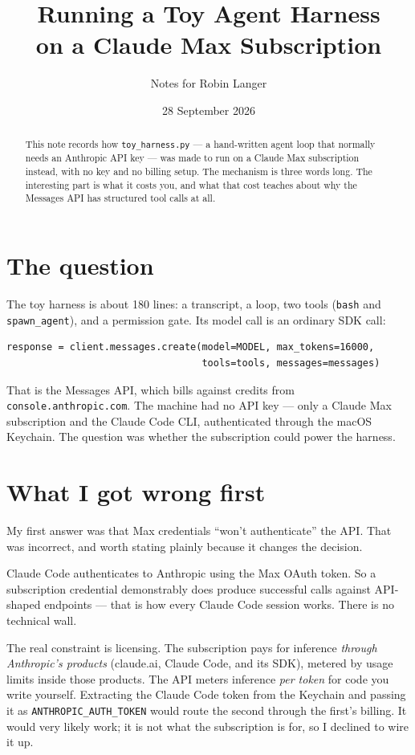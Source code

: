 \documentclass[11pt,a4paper]{article}
\title{\textbf{Running a Toy Agent Harness\\on a Claude Max Subscription}}
\author{Notes for Robin Langer}
\date{28 September 2026}
\newcommand{\code}[1]{\texttt{#1}}
\begin{document}
\maketitle

\begin{abstract}
\noindent
This note records how \code{toy\_harness.py} --- a hand-written agent loop that
normally needs an Anthropic API key --- was made to run on a Claude Max
subscription instead, with no key and no billing setup. The mechanism is three
words long. The interesting part is what it costs you, and what that cost
teaches about why the Messages API has structured tool calls at all.
\end{abstract}

\section{The question}

The toy harness is about 180 lines: a transcript, a loop, two tools
(\code{bash} and \code{spawn\_agent}), and a permission gate. Its model call is
an ordinary SDK call:

\begin{lstlisting}[style=py]
response = client.messages.create(model=MODEL, max_tokens=16000,
                                  tools=tools, messages=messages)
\end{lstlisting}

That is the Messages API, which bills against credits from
\code{console.anthropic.com}. The machine had no API key --- only a Claude Max
subscription and the Claude Code CLI, authenticated through the macOS Keychain.
The question was whether the subscription could power the harness.

\section{What I got wrong first}

My first answer was that Max credentials ``won't authenticate'' the API. That
was incorrect, and worth stating plainly because it changes the decision.

Claude Code authenticates to Anthropic using the Max OAuth token. So a
subscription credential demonstrably does produce successful calls against
API-shaped endpoints --- that is how every Claude Code session works. There is
no technical wall.

The real constraint is licensing. The subscription pays for inference
\emph{through Anthropic's products} (claude.ai, Claude Code, and its SDK),
metered by usage limits inside those products. The API meters inference
\emph{per token} for code you write yourself. Extracting the Claude Code token
from the Keychain and passing it as \code{ANTHROPIC\_AUTH\_TOKEN} would route
the second through the first's billing. It would very likely work; it is not
what the subscription is for, so I declined to wire it up.
\end{document}
